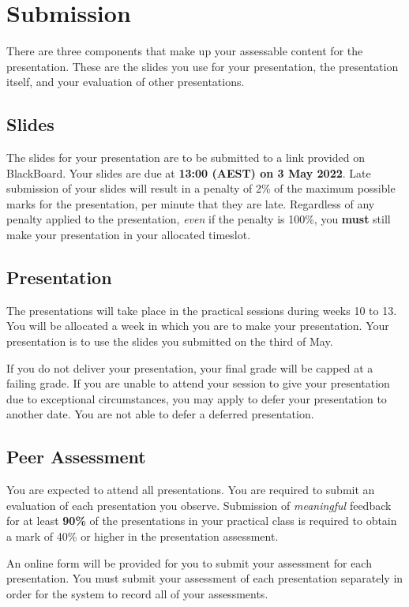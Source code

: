 \documentclass{csse4400}
\begin{document}
\section{Submission}
There are three components that make up your assessable content for the presentation.
These are the slides you use for your presentation, the presentation itself, and your evaluation of other presentations.

\subsection{Slides}
The slides for your presentation are to be submitted to a link provided on BlackBoard.
Your slides are due at \textbf{13:00 (AEST) on 3 May 2022}.
Late submission of your slides will result in a penalty of 2\% of the maximum possible marks for the presentation, per minute that they are late.
Regardless of any penalty applied to the presentation, \emph{even} if the penalty is 100\%,
you \textbf{must} still make your presentation in your allocated timeslot.

\subsection{Presentation}
The presentations will take place in the practical sessions during weeks 10 to 13.
You will be allocated a week in which you are to make your presentation.
Your presentation is to use the slides you submitted on the third of May.

If you do not deliver your presentation, your final grade will be capped at a failing grade.
If you are unable to attend your session to give your presentation due to exceptional circumstances,
you may apply to defer your presentation to another date.
You are not able to defer a deferred presentation.

\subsection{Peer Assessment}
You are expected to attend all presentations.
You are required to submit an evaluation of each presentation you observe.
Submission of \emph{meaningful} feedback for at least \textbf{90\%} of the presentations in your practical class
is required to obtain a mark of 40\% or higher in the presentation assessment.

An online form will be provided for you to submit your assessment for each presentation.
You must submit your assessment of each presentation separately in order for the system to record all of your assessments.
\end{document}
